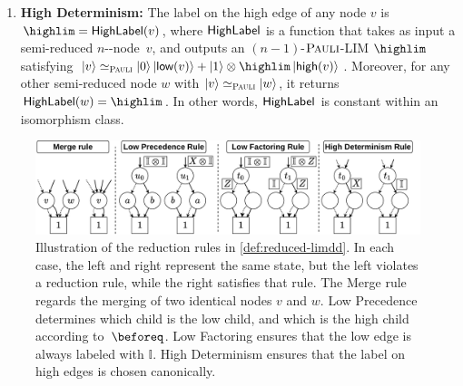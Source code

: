 \begin{definition}
\begin{enumerate}
		\item \textbf{High Determinism: } The label on the high edge of any node $v$ is $\highlim =\highlabel(v)$, where $\textsf{HighLabel}$ is a function that takes as input a semi-reduced $n$-{\Pauli}-\limdd node~$v$, and outputs an $(n-1)$-$\textsc{Pauli}$-LIM $\highlim$
        satisfying
       $\ket v \simeq_{\Pauli} \ket{0}\ket{\low v}+\ket{1}\otimes \highlim\ket{\high v}$.
        Moreover, for any other semi-reduced node $w$ with $\ket{v}\simeq_{\textsc{Pauli}}\ket{w}$,
         it returns $\highlabel(w) = \highlim$.
		In other words, $\textsf{HighLabel}$ is constant within an isomorphism class.		
	\end{enumerate}
\end{definition}


\begin{figure}\begin{center}
	\includegraphics[width=1\textwidth]{pics/necessity-of-reduction-rules.pdf}
	\caption{Illustration of the reduction rules in \autoref{def:reduced-limdd}.
		In each case, the left and right \limdds represent the same state, but the left \limdd violates a reduction rule, while the right \limdd satisfies that rule.
        The Merge rule regards the merging of two identical nodes $v$ and $w$.
		Low Precedence determines which child is the low child, and which is the high child according to~$\beforeq$.
		Low Factoring ensures that the low edge is always labeled with $\mathbb I$.
		High Determinism ensures that the label on high edges is chosen canonically.
		}
	\label{fig:necessity-of-reduction-rules}
\end{center}
\end{figure}

